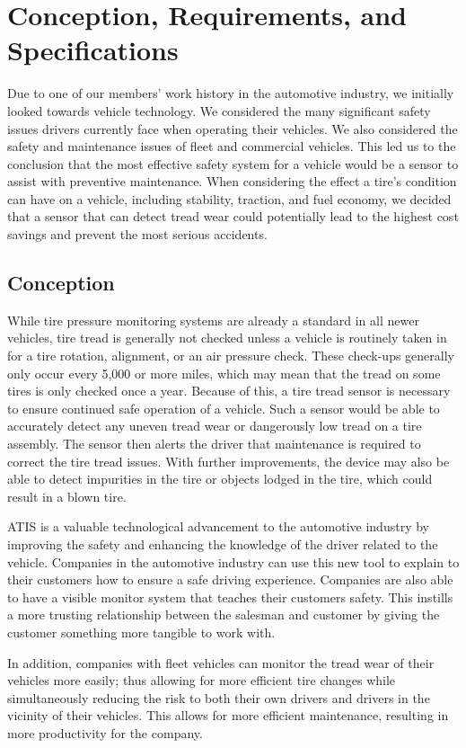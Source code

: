 \documentclass[11pt]{IEEEtran}
\begin{document}
	\section{Conception, Requirements, and Specifications}
		Due to one of our members’ work history in the automotive industry, we initially looked towards vehicle technology. We considered the many significant safety issues drivers currently face when operating their vehicles. We also considered the safety and maintenance issues of fleet and commercial vehicles. This led us to the conclusion that the most effective safety system for a vehicle would be a sensor to assist with preventive maintenance. When considering the effect a tire’s condition can have on a vehicle, including stability, traction, and fuel economy, we decided that a sensor that can detect tread wear could potentially lead to the highest cost savings and prevent the most serious accidents.

		\subsection{Conception}
			While tire pressure monitoring systems are already a standard in all newer vehicles, tire tread is generally not checked unless a vehicle is routinely taken in for a tire rotation, alignment, or an air pressure check. These check-ups generally only occur every 5,000 or more miles, which may mean that the tread on some tires is only checked once a year. Because of this, a tire tread sensor is necessary to ensure continued safe operation of a vehicle. Such a sensor would be able to accurately detect any uneven tread wear or dangerously low tread on a tire assembly. The sensor then alerts the driver that maintenance is required to correct the tire tread issues. With further improvements, the device may also be able to detect impurities in the tire or objects lodged in the tire, which could result in a blown tire.

			ATIS is a valuable technological advancement to the automotive industry by improving the safety and enhancing the knowledge of the driver related to the vehicle. Companies in the automotive industry can use this new tool to explain to their customers how to ensure a safe driving experience. Companies are also able to have a visible monitor system that teaches their customers safety. This instills a more trusting relationship between the salesman and customer by giving the customer something more tangible to work with.

			In addition, companies with fleet vehicles can monitor the tread wear of their vehicles more easily; thus allowing for more efficient tire changes while simultaneously reducing the risk to both their own drivers and drivers in the vicinity of their vehicles. This allows for more efficient maintenance, resulting in more productivity for the company. 
\end{document}
